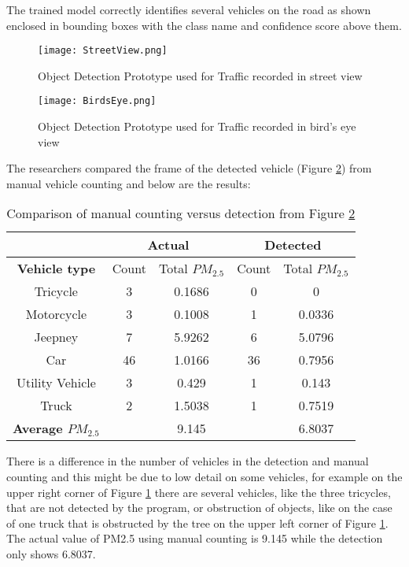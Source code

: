 The trained model correctly identifies several vehicles on the road as shown enclosed in bounding boxes with the class name and confidence score above them.


\begin{figure}[h!]
	\texttt{[image: StreetView.png]}
	\caption{Object Detection Prototype used for Traffic recorded in street view}
	\label{fig:StreetView}
\end{figure}

\begin{figure}[h!]
	\texttt{[image: BirdsEye.png]}
	\caption{Object Detection Prototype used for Traffic recorded in bird's eye view}
	\label{fig:BirdsEye}
\end{figure}

\newpage
The researchers compared the frame of the detected vehicle (Figure \ref{fig:BirdsEye}) from manual vehicle counting and below are the results:

\begin{table}[ht]   %
	\centering
	\caption{Comparison of manual counting versus detection from Figure \ref{fig:BirdsEye}} \vspace{0.25em}
	\begin{tabular}{|c|c|c|c|c|} \hline
		\centering  & 	\multicolumn{2}{|c|}{\textbf {Actual}} & 	\multicolumn{2}{|c|}{\textbf {Detected}} \\ \hline
		\textbf {Vehicle type} & Count & Total $PM_{2.5}$  & Count & Total $PM_{2.5}$ \\ \hline
		Tricycle   & 3  & 0.1686 & 0 & 0\\ \hline
		Motorcycle& 3  &0.1008  & 1 & 0.0336\\ \hline
		Jeepney &7 &5.9262  &6	& 5.0796\\ \hline
		Car & 46 & 1.0166  & 36  & 0.7956\\ \hline
		Utility Vehicle & 3 & 0.429 & 1 & 0.143\\ \hline
		Truck & 2 & 1.5038 & 1 & 0.7519\\ \hline
		
		\textbf{Average $PM_{2.5}$} & & 9.145 & & 6.8037\\ \hline
		
	\end{tabular}
	\label{tab:emission}
\end{table}


There is a difference in the number of vehicles in the detection and manual counting and this might be due to low detail on some vehicles, for example on the upper right corner of Figure \ref{fig:StreetView} there are several vehicles, like the three tricycles, that are not detected by the program, or obstruction of objects, like on the case of one truck that is obstructed by the tree on the upper left corner of Figure \ref{fig:StreetView}. The actual value of PM2.5 using manual counting is 9.145 while the detection only shows 6.8037.


